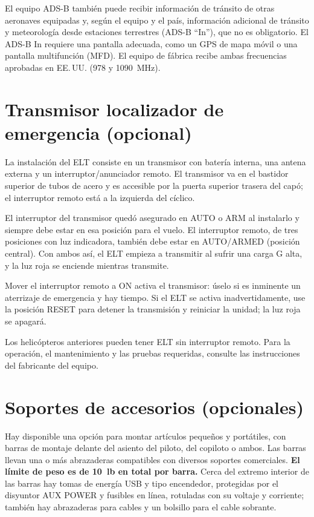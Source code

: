 El equipo ADS-B también puede recibir información de tránsito de otras aeronaves equipadas y, según el equipo y el país, información adicional de tránsito y meteorología desde estaciones terrestres (ADS-B ``In''), que no es obligatorio. El ADS-B In requiere una pantalla adecuada, como un GPS de mapa móvil o una pantalla multifunción (MFD). El equipo de fábrica recibe ambas frecuencias aprobadas en EE.\,UU. (978 y 1090~MHz).

\section{Transmisor localizador de emergencia (opcional)}

La instalación del ELT consiste en un transmisor con batería interna, una antena externa y un interruptor/anunciador remoto. El transmisor va en el bastidor superior de tubos de acero y es accesible por la puerta superior trasera del capó; el interruptor remoto está a la izquierda del cíclico.

El interruptor del transmisor quedó asegurado en \textsf{AUTO} o \textsf{ARM} al instalarlo y siempre debe estar en esa posición para el vuelo. El interruptor remoto, de tres posiciones con luz indicadora, también debe estar en \textsf{AUTO/ARMED} (posición central). Con ambos así, el ELT empieza a transmitir al sufrir una carga G alta, y la luz roja se enciende mientras transmite.

Mover el interruptor remoto a \textsf{ON} activa el transmisor: úselo si es inminente un aterrizaje de emergencia y hay tiempo. Si el ELT se activa inadvertidamente, use la posición \textsf{RESET} para detener la transmisión y reiniciar la unidad; la luz roja se apagará.

\begin{nota}
Los helicópteros anteriores pueden tener ELT sin interruptor remoto. Para la operación, el mantenimiento y las pruebas requeridas, consulte las instrucciones del fabricante del equipo.
\end{nota}

\section{Soportes de accesorios (opcionales)}

Hay disponible una opción para montar artículos pequeños y portátiles, con barras de montaje delante del asiento del piloto, del copiloto o ambos. Las barras llevan una o más abrazaderas compatibles con diversos soportes comerciales. \textbf{El límite de peso es de 10~lb en total por barra.} Cerca del extremo interior de las barras hay tomas de energía USB y tipo encendedor, protegidas por el disyuntor \textsf{AUX POWER} y fusibles en línea, rotuladas con su voltaje y corriente; también hay abrazaderas para cables y un bolsillo para el cable sobrante.

